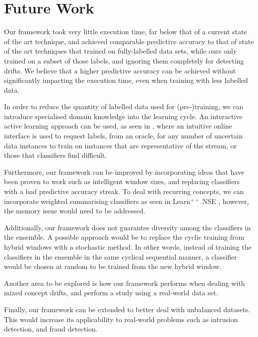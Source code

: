 
\section{Future Work}
Our framework took very little execution time, far below that of a current state of the art technique, and achieved comparable predictive accuracy to that of state of the art techniques that trained on fully-labelled data sets, while ours only trained on a subset of those labels, and ignoring them completely for detecting drifts. We believe that a higher predictive accuracy can be achieved without significantly impacting the execution time, even when training with less labelled data.

In order to reduce the quantity of labelled data used for (pre-)training, we can introduce specialised domain knowledge into the learning cycle. An interactive active learning approach can be used, as seen in \cite{floyd2017activetext}, where an intuitive online interface is used to request labels, from an oracle, for any number of uncertain data instances to train on instances that are representative of the stream, or those that classifiers find difficult.

Furthermore, our framework can be improved by incorporating ideas that have been proven to work such as intelligent window sizes, and replacing classifiers with a bad predictive accuracy streak. To deal with recurring concepts, we can incorporate weighted summarising classifiers as seen in Learn$^{++}$.NSE \cite{elwell2011incremental}, however, the memory issue would need to be addressed.

Additionally, our framework does not guarantee diversity among the classifiers in the ensemble. A possible approach would be to replace the cyclic training from hybrid windows with a stochastic method. In other words, instead of training the classifiers in the ensemble in the same cyclical sequential manner, a classifier would be chosen at random to be trained from the new hybrid window.

Another area to be explored is how our framework performs when dealing with mixed concept drifts, and perform a study using a real-world data set.

Finally, our framework can be extended to better deal with unbalanced datasets. This would increase its applicability to real-world problems such as intrusion detection, and fraud detection.